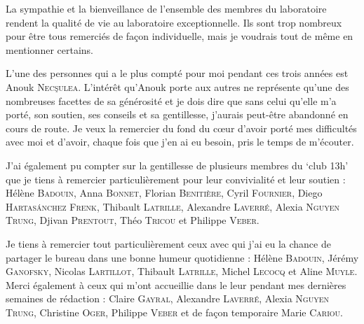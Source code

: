 La sympathie et la bienveillance de l'ensemble des membres du laboratoire rendent la qualité de vie au laboratoire exceptionnelle.
Ils sont trop nombreux pour être tous remerciés de façon individuelle, mais je voudrais tout de même en mentionner certains.



L'une des personnes qui a le plus compté pour moi pendant ces trois années est Anouk \textsc{Nec\c{s}ulea}.
L'intérêt qu'Anouk porte aux autres ne représente qu'une des nombreuses facettes de sa générosité et je dois dire que sans celui qu'elle m'a porté, son soutien, ses conseils et sa gentillesse, j'aurais peut-être abandonné en cours de route.
Je veux la remercier du fond du cœur d'avoir porté mes difficultés avec moi et d'avoir, chaque fois que j'en ai eu besoin, pris le temps de m'écouter.


J'ai également pu compter sur la gentillesse de plusieurs membres du ‘club 13h’ que je tiens à remercier particulièrement pour leur convivialité et leur soutien :
Hélène \textsc{Badouin},
Anna \textsc{Bonnet},
Florian \textsc{Benitière},
Cyril \textsc{Fournier},
Diego \textsc{Hartas\'anchez Frenk},
Thibault \textsc{Latrille},
Alexandre \textsc{Laverré}, Alexia \textsc{Nguyen Trung},
Djivan \textsc{Prentout},
Théo \textsc{Tricou} et
Philippe \textsc{Veber}.




Je tiens à remercier tout particulièrement ceux avec qui j'ai eu la chance de partager le bureau dans une bonne humeur quotidienne : Hélène \textsc{Badouin}, Jérémy \textsc{Ganofsky}, Nicolas \textsc{Lartillot}, Thibault \textsc{Latrille}, Michel \textsc{Lecocq} et Aline \textsc{Muyle}.
Merci également à ceux qui m'ont accueillie dans le leur pendant mes dernières semaines de rédaction : Claire \textsc{Gayral}, Alexandre \textsc{Laverré}, Alexia \textsc{Nguyen Trung}, Christine \textsc{Oger}, Philippe \textsc{Veber} et de façon temporaire Marie \textsc{Cariou}.

